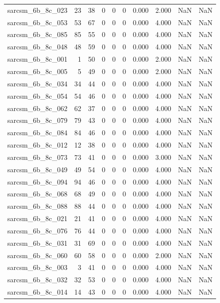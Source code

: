\documentclass{article}
\begin{document}
\begin{longtable}{lrrrrrrrrr}
sarcsm\_6b\_8c\_023 & 23 & 38 & 0 & 0 & 0 & 0.000 & 2.000 & NaN & NaN \\
sarcsm\_6b\_8c\_053 & 53 & 67 & 0 & 0 & 0 & 0.000 & 4.000 & NaN & NaN \\
sarcsm\_6b\_8c\_085 & 85 & 55 & 0 & 0 & 0 & 0.000 & 4.000 & NaN & NaN \\
sarcsm\_6b\_8c\_048 & 48 & 59 & 0 & 0 & 0 & 0.000 & 4.000 & NaN & NaN \\
sarcsm\_6b\_8c\_001 & 1 & 50 & 0 & 0 & 0 & 0.000 & 2.000 & NaN & NaN \\
sarcsm\_6b\_8c\_005 & 5 & 49 & 0 & 0 & 0 & 0.000 & 2.000 & NaN & NaN \\
sarcsm\_6b\_8c\_034 & 34 & 44 & 0 & 0 & 0 & 0.000 & 4.000 & NaN & NaN \\
sarcsm\_6b\_8c\_054 & 54 & 46 & 0 & 0 & 0 & 0.000 & 4.000 & NaN & NaN \\
sarcsm\_6b\_8c\_062 & 62 & 37 & 0 & 0 & 0 & 0.000 & 4.000 & NaN & NaN \\
sarcsm\_6b\_8c\_079 & 79 & 43 & 0 & 0 & 0 & 0.000 & 4.000 & NaN & NaN \\
sarcsm\_6b\_8c\_084 & 84 & 46 & 0 & 0 & 0 & 0.000 & 4.000 & NaN & NaN \\
sarcsm\_6b\_8c\_012 & 12 & 38 & 0 & 0 & 0 & 0.000 & 4.000 & NaN & NaN \\
sarcsm\_6b\_8c\_073 & 73 & 41 & 0 & 0 & 0 & 0.000 & 3.000 & NaN & NaN \\
sarcsm\_6b\_8c\_049 & 49 & 54 & 0 & 0 & 0 & 0.000 & 4.000 & NaN & NaN \\
sarcsm\_6b\_8c\_094 & 94 & 46 & 0 & 0 & 0 & 0.000 & 4.000 & NaN & NaN \\
sarcsm\_6b\_8c\_068 & 68 & 49 & 0 & 0 & 0 & 0.000 & 4.000 & NaN & NaN \\
sarcsm\_6b\_8c\_088 & 88 & 44 & 0 & 0 & 0 & 0.000 & 4.000 & NaN & NaN \\
sarcsm\_6b\_8c\_021 & 21 & 41 & 0 & 0 & 0 & 0.000 & 4.000 & NaN & NaN \\
sarcsm\_6b\_8c\_076 & 76 & 44 & 0 & 0 & 0 & 0.000 & 4.000 & NaN & NaN \\
sarcsm\_6b\_8c\_031 & 31 & 69 & 0 & 0 & 0 & 0.000 & 4.000 & NaN & NaN \\
sarcsm\_6b\_8c\_060 & 60 & 58 & 0 & 0 & 0 & 0.000 & 2.000 & NaN & NaN \\
sarcsm\_6b\_8c\_003 & 3 & 41 & 0 & 0 & 0 & 0.000 & 4.000 & NaN & NaN \\
sarcsm\_6b\_8c\_032 & 32 & 53 & 0 & 0 & 0 & 0.000 & 4.000 & NaN & NaN \\
sarcsm\_6b\_8c\_014 & 14 & 43 & 0 & 0 & 0 & 0.000 & 4.000 & NaN & NaN \\

\end{longtable}
\end{document}
